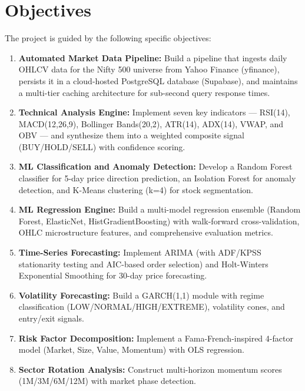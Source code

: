 \documentclass[12pt, a4paper, oneside]{report}
\begin{document}
\section{Objectives}
\label{sec:objectives}

The project is guided by the following specific objectives:

\begin{enumerate}[nosep]
    \item \textbf{Automated Market Data Pipeline:} Build a pipeline that ingests daily OHLCV data for the Nifty 500 universe from Yahoo Finance (yfinance), persists it in a cloud-hosted PostgreSQL database (Supabase), and maintains a multi-tier caching architecture for sub-second query response times.

    \item \textbf{Technical Analysis Engine:} Implement seven key indicators --- RSI(14), MACD(12,26,9), Bollinger Bands(20,2), ATR(14), ADX(14), VWAP, and OBV --- and synthesize them into a weighted composite signal (BUY/HOLD/SELL) with confidence scoring.

    \item \textbf{ML Classification and Anomaly Detection:} Develop a Random Forest classifier for 5-day price direction prediction, an Isolation Forest for anomaly detection, and K-Means clustering (k=4) for stock segmentation.

    \item \textbf{ML Regression Engine:} Build a multi-model regression ensemble (Random Forest, ElasticNet, HistGradientBoosting) with walk-forward cross-validation, OHLC microstructure features, and comprehensive evaluation metrics.

    \item \textbf{Time-Series Forecasting:} Implement ARIMA (with ADF/KPSS stationarity testing and AIC-based order selection) and Holt-Winters Exponential Smoothing for 30-day price forecasting.

    \item \textbf{Volatility Forecasting:} Build a GARCH(1,1) module with regime classification (LOW/NORMAL/HIGH/EXTREME), volatility cones, and entry/exit signals.

    \item \textbf{Risk Factor Decomposition:} Implement a Fama-French-inspired 4-factor model (Market, Size, Value, Momentum) with OLS regression.

    \item \textbf{Sector Rotation Analysis:} Construct multi-horizon momentum scores (1M/3M/6M/12M) with market phase detection.


\end{enumerate}
\end{document}
